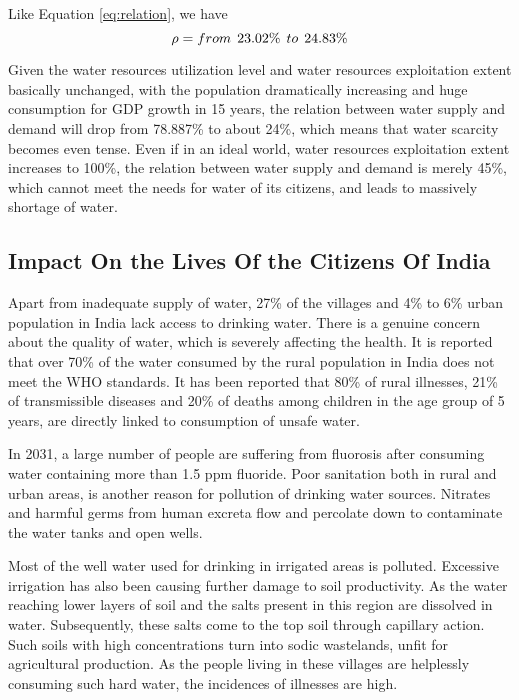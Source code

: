 \documentclass[tcn = 45538, sheet = true, abstract = true]{mcmthesis}
\begin{document}
Like Equation \ref{eq:relation}, 
we have
\begin{equation}
\rho = from\hspace{1 ex} 23.02\%\hspace{1 ex} to\hspace{1 ex} 24.83\%
\end{equation}

Given the water resources utilization level and water resources exploitation extent basically unchanged, 
with the population dramatically increasing and huge consumption for GDP growth in 15 years, 
the relation between water supply and demand will drop from 78.887\% to about 24\%, 
which means that water scarcity becomes even tense. 
Even if in an ideal world, 
water resources exploitation extent increases to 100\%, 
the relation between water supply and demand is merely 45\%, 
which cannot meet the needs for water of its citizens, 
and leads to massively shortage of water.

\subsection{Impact On the Lives Of the Citizens Of India}

\hspace{1.5 em} Apart from inadequate supply of water, 
27\% of the villages and 4\% to 6\% urban population in India lack access to drinking water. 
There is a genuine concern about the quality of water, 
which is severely affecting the health. 
It is reported that over 70\% of the water consumed by the rural population in India does not meet the WHO standards. 
It has been reported that 80\% of rural illnesses, 
21\% of transmissible diseases and 20\% of deaths among children in the age group of 5 years, 
are directly linked to consumption of unsafe water. 

In 2031, 
a large number of people are suffering from fluorosis after consuming water containing more than 1.5 ppm fluoride. 
Poor sanitation both in rural and urban areas, is another reason for pollution of drinking water sources. 
Nitrates and harmful germs from human excreta flow and percolate down to contaminate the water tanks and open wells. 

Most of the well water used for drinking in irrigated areas is polluted. 
Excessive irrigation has also been causing further damage to soil productivity. 
As the water reaching lower layers of soil and the salts present in this region are dissolved in water. 
Subsequently, these salts come to the top soil through capillary action. 
Such soils with high concentrations turn into sodic wastelands, 
unfit for agricultural production. 
As the people living in these villages are helplessly consuming such hard water, the incidences of illnesses are high.
\end{document}
